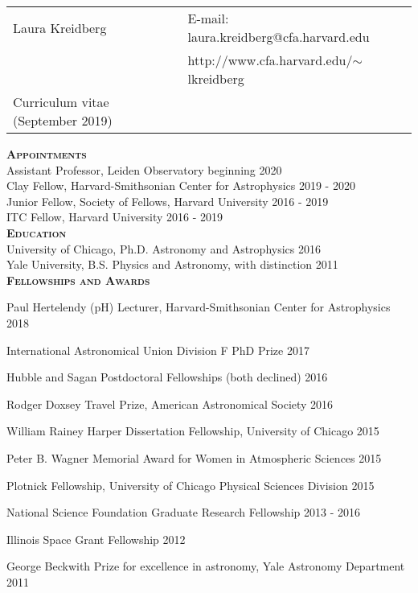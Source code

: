 \documentclass[12pt,letterpaper]{article}
\def\name{Laura R. Kreidberg}
\begin{document}
\sloppy


\begin{tabular}{@{}p{4.0in}@{}p{5.0in}}
    \LARGE{Laura Kreidberg}                  & E-mail: laura.kreidberg@cfa.harvard.edu\\  
    \,                                       & http://www.cfa.harvard.edu/$\sim$lkreidberg \\ 
    \large{Curriculum vitae} (September 2019) & \, \\
\end{tabular}
\vspace{8mm}

\textbf{\textsc{Appointments}}\\
Assistant Professor, Leiden Observatory \hfill beginning 2020\\
Clay Fellow, Harvard-Smithsonian Center for Astrophysics \hfill 2019 - 2020\\
Junior Fellow, Society of Fellows, Harvard University \hfill 2016 - 2019\\
ITC Fellow, Harvard University \hfill 2016 - 2019\\

\textbf{\textsc{Education}}\\
University of Chicago, Ph.D. Astronomy and Astrophysics \hfill 2016\\
Yale University, B.S. Physics and Astronomy, with distinction \hfill 2011\\

\textbf{\textsc{Fellowships and Awards}}
\begin{compactitem}[]
\item Paul Hertelendy (pH) Lecturer, Harvard-Smithsonian Center for Astrophysics \hfill 2018 
\item International Astronomical Union Division F PhD Prize \hfill 2017
\item Hubble and Sagan Postdoctoral Fellowships (both declined) \hfill 2016
\item Rodger Doxsey Travel Prize, American Astronomical Society \hfill 2016
\item William Rainey Harper Dissertation Fellowship, University of Chicago \hfill 2015
\item Peter B. Wagner Memorial Award for Women in Atmospheric Sciences \hfill 2015
\item Plotnick Fellowship, University of Chicago Physical Sciences Division \hfill 2015
\item National Science Foundation Graduate Research Fellowship \hfill 2013 - 2016
\item Illinois Space Grant Fellowship \hfill 2012
\item George Beckwith Prize for excellence in astronomy, Yale Astronomy Department \hfill2011
\end{compactitem}
\vspace{6mm}
\end{document}
